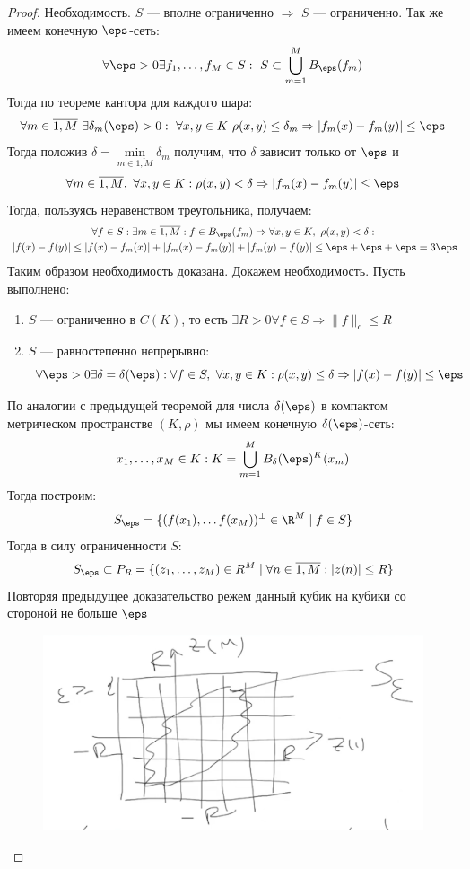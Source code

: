 \begin{proof}
	Необходимость. $S$ --- вполне ограниченно $\Rightarrow$ $S$ --- ограниченно. Так же имеем конечную $\eps$-сеть:
	$$
	\forall \eps > 0 \exists f_1, \dots, f_M \in S: \ S \subset \bigcup_{m = 1}^M B_\eps(f_m)
	$$
	Тогда по теореме кантора для каждого шара:
	$$
	\forall m \in \overline{1, M} \ \exists \delta_m(\eps) > 0 : \ \forall x,y \in K \ \rho(x,y) \leq \delta_m \Rightarrow |f_m(x) - f_m(y)| \leq \eps 
	$$
	Тогда положив $\delta = \min\limits_{m \in \overline{1, M}} \delta_m$ получим, что $\delta$ зависит только от $\eps$ и 
	$$
	\forall m \in \overline{1, M}, \ \forall x,y \in K:  \rho(x,y) < \delta \Rightarrow |f_m(x) - f_m(y)| \leq \eps 
	$$
	Тогда, пользуясь неравенством треугольника, получаем:
	$$
	\begin{gathered}
	\forall f \in S: \exists m \in \overline{1, M}: f \in B_\eps(f_m) \Rightarrow \forall x,y \in K, \ \rho(x,y) < \delta: \\ \ |f(x) - f(y)| \leq |f(x) - f_m(x)| + |f_m(x) - f_m(y)| + |f_m(y) - f(y)| \leq \eps + \eps + \eps = 3\eps
	\end{gathered}
	$$
	Таким образом необходимость доказана. Докажем необходимость. Пусть выполнено:
	\begin{enumerate}
		\item $S$ --- ограниченно в $C(K)$, то есть $\exists R > 0 \forall f \in S \Rightarrow \|f\|_c \leq R$
		\item $S$ --- равностепенно непрерывно: 
		$$
		\forall \eps > 0 \exists \delta = \delta(\eps): \forall f \in S, \ \forall x, y \in K : \rho(x,y) \leq \delta \Rightarrow |f(x) - f(y)| \leq \eps 
		$$
	\end{enumerate}
	По аналогии с предыдущей теоремой для числа $\delta(\eps)$ в компактом метрическом пространстве $(K, \rho)$ мы имеем конечную $\delta(\eps)$-сеть:
	$$
	x_1, \dots, x_M \in K: K = \bigcup_{m=1}^M B_\delta(\eps)^K(x_m) 
	$$
	Тогда построим:
	$$
	S_\eps = \{(f(x_1), \dots f(x_M))^\perp \in \R^M \mid f \in S\}
	$$
	Тогда в силу ограниченности $S$:
	$$
	S_\eps \subset P_R = \{(z_1, \dots, z_M) \in R^M \mid \forall n \in \overline{1, M}: |z(n)| \leq R \}
	$$
	\newpage
	Повторяя предыдущее доказательство режем данный кубик на кубики со стороной не больше $\eps$
	\begin{figure}[h!]
		\centering
		\includegraphics[width=0.7\linewidth]{pic/screenshot001}

\end{figure}
\end{proof}
